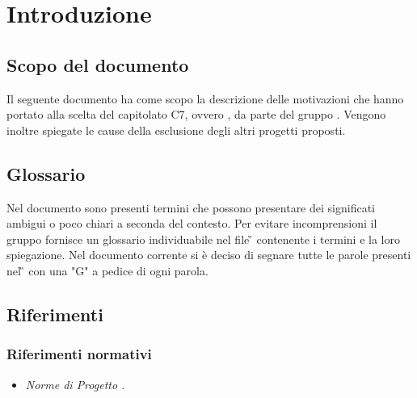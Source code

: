 \section{Introduzione}

\subsection{Scopo del documento}
Il seguente documento ha come scopo la descrizione delle motivazioni che hanno
portato alla scelta del capitolato C7, ovvero \progetto{}, da parte del gruppo \gruppo{}. Vengono inoltre spiegate le cause della esclusione degli altri progetti proposti.

\subsection{Glossario}
Nel documento sono presenti termini che possono presentare dei significati ambigui o poco chiari a seconda del contesto.
Per evitare incomprensioni il gruppo fornisce un glossario individuabile nel file \G{} \versGlo{} contenente i termini e la loro spiegazione.\newline{}
Nel documento corrente si è deciso di segnare tutte le parole presenti nel \G{} con una "G" a pedice di ogni parola.

\subsection{Riferimenti}

\subsubsection{Riferimenti normativi}
\begin{itemize}
\item \textit{Norme di Progetto \versNdP.}
\end{itemize}

